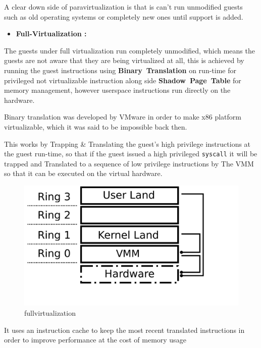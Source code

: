 \documentclass[
  14pt,
  english,
  a4paper,
]{scrreprt}
\providecommand{\tightlist}{%
  \setlength{\itemsep}{0pt}\setlength{\parskip}{0pt}}
\begin{document}
A clear down side of paravirtualization is that is can't run unmodified
guests such as old operating systems or completely new ones until
support is added.

\begin{itemize}
\tightlist
\item
  \textbf{Full-Virtualization :}
\end{itemize}

The guests under full virtualization run completely unmodified, which
means the guests are not aware that they are being virtualized at all,
this is achieved by running the guest instructions using
\textbf{Binary~Translation} on run-time for privileged not virtualizable
instruction along side \textbf{Shadow~Page~Table} for memory management,
however userspace instructions run directly on the hardware.

Binary translation was developed by VMware in order to make x86 platform
virtualizable, which it was said to be impossible back then.

This works by Trapping \& Translating the guest's high privilege
instructions at the guest run-time, so that if the guest issued a high
privileged \texttt{syscall} it will be trapped and Translated to a
sequence of low privilege instructions by The VMM so that it can be
executed on the virtual hardware.

\begin{figure}
\hypertarget{fig:fullvirt}{%
\centering
\includegraphics[width=1\textwidth,height=\textheight]{figures/fullvirtualization_diagram.png}
\caption{fullvirtualization}\label{fig:fullvirt}
}
\end{figure}

It uses an instruction cache to keep the most recent translated
instructions in order to improve performance at the cost of memory usage
\end{document}
